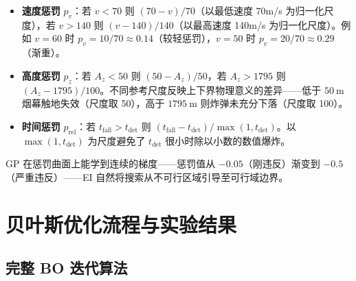 \documentclass[12pt,a4paper]{ctexart}
\newcommand{\tdet}{t_{\text{det}}}
\begin{document}
\begin{itemize}
    \item \textbf{速度惩罚} $p_v$：若 $v < 70$ 则 $(70 - v)/70$（以最低速度 70m/s 为归一化尺度），若 $v > 140$ 则 $(v - 140)/140$（以最高速度 140m/s 为归一化尺度）。例如 $v = 60$ 时 $p_v = 10/70 \approx 0.14$（较轻惩罚），$v = 50$ 时 $p_v = 20/70 \approx 0.29$（渐重）。
    \item \textbf{高度惩罚} $p_z$：若 $A_z < 50$ 则 $(50 - A_z)/50$，若 $A_z > 1795$ 则 $(A_z - 1795)/100$。不同参考尺度反映上下界物理意义的差异——低于 $50\ \mathrm{m}$ 烟幕触地失效（尺度取 50），高于 $1795\ \mathrm{m}$ 则炸弹未充分下落（尺度取 100）。
    \item \textbf{时间惩罚} $p_{\text{rel}}$：若 $t_{\text{fall}} > \tdet$ 则 $(t_{\text{fall}} - \tdet) / \max(1, \tdet)$。以 $\max(1, \tdet)$ 为尺度避免了 $\tdet$ 很小时除以小数的数值爆炸。
\end{itemize}

GP 在惩罚曲面上能学到连续的梯度——惩罚值从 $-0.05$（刚违反）渐变到 $-0.5$（严重违反）——EI 自然将搜索从不可行区域引导至可行域边界。

\section{贝叶斯优化流程与实验结果}
\label{sec:exp}

\subsection{完整 BO 迭代算法}
\end{document}
